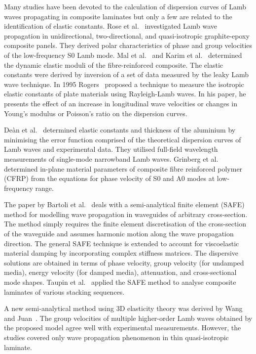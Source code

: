 \documentclass[preprint,12pt]{elsarticle}
\begin{document}
	Many studies have been devoted to the calculation of dispersion curves of Lamb waves propagating in composite laminates but only a few are related to the identification of elastic constants. Rose et al.~\cite{Rose1987} investigated Lamb wave propagation in unidirectional, two-directional, and quasi-isotropic graphite-epoxy composite panels. They derived polar characteristics of phase and group velocities of the low-frequency S0 Lamb mode. Mal et al.~\cite{Mal1993} and Karim et al.~\cite{Karim1990} determined the dynamic elastic moduli of the fibre-reinforced composite. The elastic constants were derived by inversion of a set of data measured by the leaky Lamb wave technique. In 1995 Rogers~\cite{Rogers1995} proposed a technique to measure the isotropic elastic constants of plate materials using Rayleigh-Lamb waves. In his paper, he presents the effect of an increase in longitudinal wave velocities or changes in Young’s modulus or Poisson’s ratio on the dispersion curves.

	De\`an et al.~\cite{Dean2008} determined elastic constants and thickness of the aluminium by minimising the error function comprised of the theoretical dispersion curves of Lamb waves and experimental data. They utilised full-field wavelength measurements of single-mode narrowband Lamb waves. Grinberg et al.~\cite{Grimberg2010} determined in-plane material parameters of composite fibre reinforced polymer (CFRP) from the equations for phase velocity of S0 and A0 modes at low-frequency range. 

	The paper by Bartoli et al.~\cite{Bartoli2006} deals with a semi-analytical finite element (SAFE) method for modelling wave propagation in waveguides of arbitrary cross-section. The method simply requires the finite element discretisation of the cross-section of the waveguide and assumes harmonic motion along the wave propagation direction. The general SAFE technique is extended to account for viscoelastic material damping by incorporating complex stiffness matrices. The dispersive solutions are obtained in terms of phase velocity, group velocity (for undamped media), energy velocity (for damped media), attenuation, and cross-sectional mode shapes. Taupin et al.~\cite{Taupin2011} applied the SAFE method to analyse composite laminates of various stacking sequences.

	A new semi-analytical method using 3D elasticity theory was derived by Wang and Juan~\cite{Wang2007}. The group velocities of multiple higher-order Lamb waves obtained by the proposed model agree well with experimental measurements. However, the studies covered only wave propagation phenomenon in thin quasi-isotropic laminate. 
\end{document}
